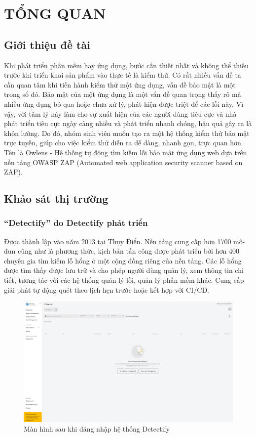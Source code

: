 \chapter{TỔNG QUAN}

\section{Giới thiệu đề tài}

\tab Khi phát triển phần mềm hay ứng dụng, bước cần thiết nhất và không thể thiếu trước khi triển khai sản phẩm vào thực tế là kiểm thử.
Có rất nhiều vấn đề ta cần quan tâm khi tiến hành kiểm thử một ứng dụng, vấn đề bảo mật là một trong số đó.
Bảo mật của một ứng dụng là một vấn đề quan trọng thấy rõ mà nhiều ứng dụng bỏ qua hoặc chưa xử lý, phát hiện được triệt để các lỗi này.
Vì vậy, với tâm lý này làm cho sự xuất hiện của các người dùng tiêu cực và nhà phát triển tiêu cực ngày càng nhiều và phát triển nhanh chóng, hậu quả gây ra là khôn lường.
Do đó, nhóm sinh viên muốn tạo ra một hệ thống kiểm thử bảo mật trực tuyến, giúp cho việc kiểm thử diễn ra dễ dàng, nhanh gọn, trực quan hơn.
Tên là Owlens - Hệ thống tự động tìm kiếm lỗi bảo mật ứng dụng web dựa trên nền tảng OWASP ZAP (Automated web application security scanner based on ZAP).

\section{Khảo sát thị trường}

\subsection{“Detectify” do Detectify phát triển}

\tab Được thành lập vào năm 2013 tại Thụy Điển.
Nền tảng cung cấp hơn 1700 mô-đun cũng như là phương thức, kịch bản tấn công được phát triển bởi hơn 400 chuyên gia tìm kiếm lỗ hổng ở một cộng đồng riêng của nền tảng.
Các lỗ hổng được tìm thấy được lưu trữ và cho phép người dùng quản lý, xem thông tin chi tiết, tương tác với các hệ thống quản lý lỗi, quản lý phần mềm khác.
Cung cấp giải phát tự động quét theo lịch hẹn trước hoặc kết hợp với CI/CD.

\begin{figure}[H]
    \centering
    \includegraphics[width=\textwidth]{applied-thesis-chapters/chapter-1/detectify.com_app_vulnerabilities.png}
    \caption{Màn hình sau khi đăng nhập hệ thống Detectify}
\end{figure}

